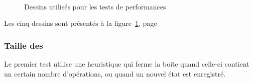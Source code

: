 \begin{figure}[h]
				\\
				\label{fig:testdrawings}
				\caption{Dessins utilisés pour les tests de performances}
			\end{figure}

			Les cinq dessins sont présentés à la figure~\ref{fig:testdrawings}, page~\pageref{fig:testdrawings}

			\subsubsection{Taille des \BO}
				Le premier test utilise une heuristique qui ferme la boite quand celle-ci contient un certain nombre d'opérations, ou
				quand un nouvel état est enregistré.

